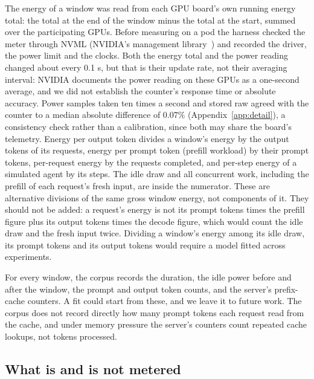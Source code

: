 \documentclass[11pt]{article}
\begin{document}
The energy of a window was read from each GPU board's own running energy total: the total at the end of the window minus the total at the start, summed over the participating GPUs. Before measuring on a pod the harness checked the meter through NVML (NVIDIA's management library~\citep{nvml}) and recorded the driver, the power limit and the clocks. Both the energy total and the power reading changed about every 0.1 s, but that is their update rate, not their averaging interval: NVIDIA documents the power reading on these GPUs as a one-second average, and we did not establish the counter's response time or absolute accuracy. Power samples taken ten times a second and stored raw agreed with the counter to a median absolute difference of 0.07\% (Appendix~\ref{app:detail}), a consistency check rather than a calibration, since both may share the board's telemetry. Energy per output token divides a window's energy by the output tokens of its requests, energy per prompt token (prefill workload) by their prompt tokens, per-request energy by the requests completed, and per-step energy of a simulated agent by its steps. The idle draw and all concurrent work, including the prefill of each request's fresh input, are inside the numerator. These are alternative divisions of the same gross window energy, not components of it. They should not be added: a request's energy is not its prompt tokens times the prefill figure plus its output tokens times the decode figure, which would count the idle draw and the fresh input twice. Dividing a window's energy among its idle draw, its prompt tokens and its output tokens would require a model fitted across experiments.

For every window, the corpus records the duration, the idle power before and after the window, the prompt and output token counts, and the server's prefix-cache counters. A fit could start from these, and we leave it to future work. The corpus does not record directly how many prompt tokens each request read from the cache, and under memory pressure the server's counters count repeated cache lookups, not tokens processed.

\subsection{What is and is not metered}\label{sec:boundary}
\end{document}
